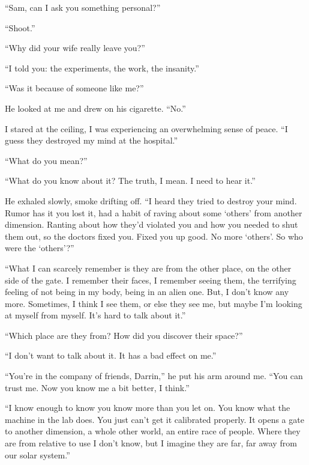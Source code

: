 \documentclass[
]{article}
\begin{document}
``Sam, can I ask you something personal?''

``Shoot.''

``Why did your wife really leave you?''

``I told you: the experiments, the work, the insanity.''

``Was it because of someone like me?''

He looked at me and drew on his cigarette. ``No.''

I stared at the ceiling, I was experiencing an overwhelming sense of
peace. ``I guess they destroyed my mind at the hospital.''

``What do you mean?''

``What do you know about it? The truth, I mean. I need to hear it.''

He exhaled slowly, smoke drifting off. ``I heard they tried to destroy
your mind. Rumor has it you lost it, had a habit of raving about some
`others' from another dimension. Ranting about how they'd violated you
and how you needed to shut them out, so the doctors fixed you. Fixed you
up good. No more `others'. So who were the `others'?''

``What I can scarcely remember is they are from the other place, on the
other side of the gate. I remember their faces, I remember seeing them,
the terrifying feeling of not being in my body, being in an alien one.
But, I don't know any more. Sometimes, I think I see them, or else they
see me, but maybe I'm looking at myself from myself. It's hard to talk
about it.''

``Which place are they from? How did you discover their space?''

``I don't want to talk about it. It has a bad effect on me.''

``You're in the company of friends, Darrin,'' he put his arm around me.
``You can trust me. Now you know me a bit better, I think.''

``I know enough to know you know more than you let on. You know what the
machine in the lab does. You just can't get it calibrated properly. It
opens a gate to another dimension, a whole other world, an entire race
of people. Where they are from relative to use I don't know, but I
imagine they are far, far away from our solar system.''
\end{document}
